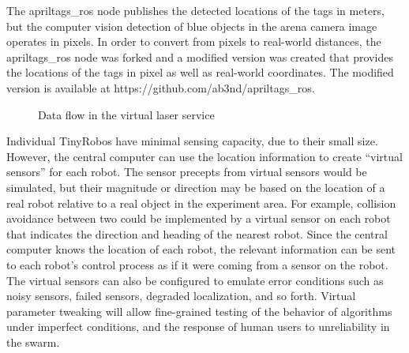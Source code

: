 \documentclass[]{article}
\begin{document}
The apriltags\_ros  node publishes the detected locations of the tags in meters, but the computer vision detection of blue objects in the arena camera image operates in pixels. 
In order to convert from pixels to real-world distances, the apriltags\_ros node was forked and a modified version was created that provides the locations of the tags in pixel as well as real-world coordinates. 
The modified version is available at https://github.com/ab3nd/apriltags\_ros.

\begin{figure}[h]
	\centering
	\caption{Data flow in the virtual laser service}
\end{figure}

Individual TinyRobos have minimal sensing capacity, due to their small size. 
However, the central computer can use the location information to create ``virtual sensors'' for each robot. 
The sensor precepts from virtual sensors would be simulated, but their magnitude or direction may be based on the location of a real robot relative to a real object in the experiment area. 
For example, collision avoidance between two could be implemented by a virtual sensor on each robot that indicates the direction and heading of the nearest robot. 
Since the central computer knows the location of each robot, the relevant information can be sent to each robot's control process as if it were coming from a sensor on the robot. 
The virtual sensors can also be configured to emulate error conditions such as noisy sensors, failed sensors, degraded localization, and so forth.
Virtual parameter tweaking will allow fine-grained testing of the behavior of algorithms under imperfect conditions, and the response of human users to unreliability in the swarm. 
\end{document}
